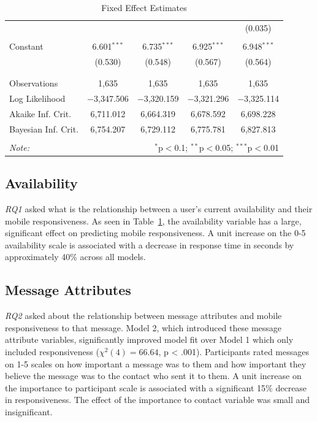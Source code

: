 \documentclass[12pt]{nuthesis}	%
\begin{document}
\begin{table}[!htbp]
\begin{tabular}{@{\extracolsep{5pt}}lcccc}
  &  &  &  & (0.035) \\ 
  & & & & \\ 
 Constant & 6.601$^{***}$ & 6.735$^{***}$ & 6.925$^{***}$ & 6.948$^{***}$ \\ 
  & (0.530) & (0.548) & (0.567) & (0.564) \\ 
  & & & & \\ 
\hline \\[-1.8ex] 
Observations & 1,635 & 1,635 & 1,635 & 1,635 \\ 
Log Likelihood & $-$3,347.506 & $-$3,320.159 & $-$3,321.296 & $-$3,325.114 \\ 
Akaike Inf. Crit. & 6,711.012 & 6,664.319 & 6,678.592 & 6,698.228 \\ 
Bayesian Inf. Crit. & 6,754.207 & 6,729.112 & 6,775.781 & 6,827.813 \\ 
\hline 
\hline \\[-1.8ex] 
\textit{Note:}  & \multicolumn{4}{r}{$^{*}$p$<$0.1; $^{**}$p$<$0.05; $^{***}$p$<$0.01} \\ 
\end{tabular} 
  \caption{Fixed Effect Estimates} 
  \label{tab:fixed_effects} 
\end{table} 


\subsection{Availability}

\textit{RQ1} asked what is the relationship between a user's current availability and their mobile responsiveness. As seen in Table~\ref{tab:fixed_effects}, the availability variable has a large, significant effect on predicting mobile responsiveness.  A unit increase on the 0-5 availability scale is associated with a decrease in response time in seconds by approximately 40\% across all models.

\subsection{Message Attributes}

\textit{RQ2} asked about the relationship between message attributes and mobile responsiveness to that message. Model 2, which introduced these message attribute variables, significantly improved model fit over Model 1 which only included responsiveness ($\chi^2(4) = 66.64$, p < .001). Participants rated messages on 1-5 scales on how important a message was to them and how important they believe the message was to the contact who sent it to them. A unit increase on the importance to participant scale is associated with a significant 15\% decrease in responsiveness. The effect of the importance to contact variable was small and insignificant.
\end{document}
